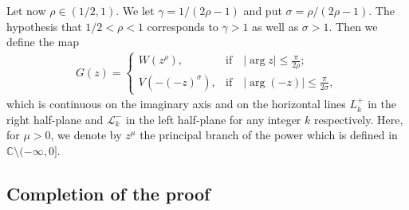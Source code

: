 \documentclass[12pt]{amsart}
\numberwithin{equation}{section}
\begin{document}
Let now $\rho\in(1/2,1)$. We let $\gamma=1/(2\rho-1)$ and put $\sigma=\rho/(2\rho-1)$. The hypothesis that $1/2<\rho<1$ corresponds to $\gamma>1$ as well as $\sigma>1$. Then we define the map
\begin{equation}\label{Def-1}
\begin{split}
G(z)=\left\{
       \begin{array}{ll}
         W(z^{\rho}),         & \text{if} \quad |\arg z|\leq \frac{\pi}{2\rho}; \\
         V(-(-z)^{\sigma}),   & \text{if} \quad |\arg(-z)|\leq \frac{\pi}{2\sigma},
       \end{array}
      \right.
\end{split}
\end{equation}
which is continuous on the imaginary axis and on the horizontal lines $L^{+}_k$ in the right half-plane and $\mathcal{L}^{-}_{k}$ in the left half-plane for any integer $k$ respectively. Here, for $\mu>0$, we denote by $z^{\mu}$ the principal branch of the power which is defined in $\mathbb{C}\setminus(-\infty,0]$.

\subsection{Completion of the proof}\label{Completion of the proof-add} %
\end{document}
